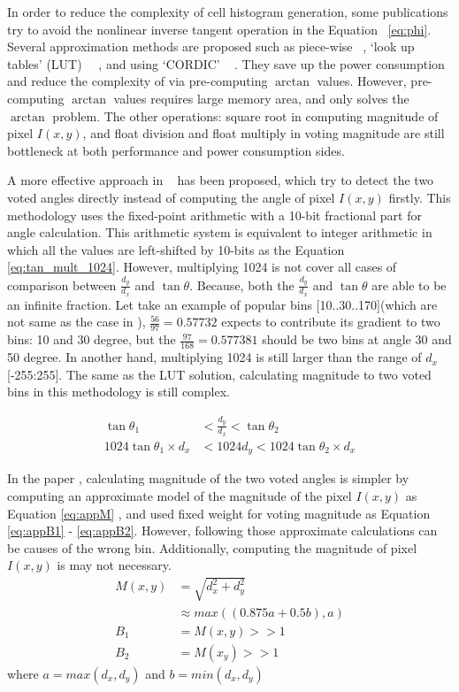 In order to reduce the complexity of cell histogram generation, some
publications try to avoid the nonlinear inverse tangent operation in the Equation ~\ref{eq:phi}.
Several approximation methods are proposed such as piece-wise
~\cite{karakaya2009iha}, ‘look up tables’ (LUT)
~\cite{gu2013ffm}~\cite{iandola2015leh}, and using ‘CORDIC’
~\cite{peker2012heh}\cite{takagi2013sdh}\cite{mizuno2012ash} .
They save up the power consumption and reduce the complexity of via
pre-computing $\arctan$ values.
However, pre-computing $\arctan$ values requires large memory area, and only
solves the $\arctan$ problem.
The other operations: square root
in computing magnitude of pixel $I(x,y)$, and float division and float
multiply in voting magnitude are still bottleneck at both performance and power consumption sides.


A more effective approach in  ~\cite{negi2011dpo} \cite{suleiman2014eho}  has
been proposed, which try to detect the two voted
angles directly instead of computing the angle of pixel $I(x,y)$ firstly.
This methodology uses the  fixed-point arithmetic with a 10-bit fractional part
for angle calculation.
This arithmetic system is equivalent to integer arithmetic in which all the
values are left-shifted by 10-bits as  the  Equation~ \ref{eq:tan_mult_1024}.
However, multiplying 1024 is not cover all cases of comparison between
$\frac{d_y}{d_x}$ and $\tan\theta$.
Because, both the $\frac{d_y}{d_x}$ and $\tan\theta$ are able to be an infinite
fraction.
Let take an example of popular bins [10..30..170](which are not same as the
case in \cite{negi2011dpo} \cite{suleiman2014eho}), $\frac{56}{97} = 0.57732$
expects to contribute its gradient to two bins: 10 and 30 degree, but the
$\frac{97}{168} = 0.577381$ should be two bins at angle 30 and 50 degree.
In another hand, multiplying 1024 is still larger than the range of $d_x$
[-255:255].
The same as the LUT solution, calculating magnitude to two voted bins in this
methodology is still complex.

\begin{align}
	\tan\theta_1 & < \frac{d_y}{d_x} < \tan\theta_2 \\
	1024\tan\theta_1\times d_x & < 1024d_y < 1024\tan\theta_2\times d_x \label{eq:tan_mult_1024}
\end{align}

In the paper \cite{pei-yinchen2014ehia} \cite{hsiao2016hdh}   ,  calculating magnitude of the two voted
angles is simpler by computing an approximate model of the magnitude of the pixel
$I(x,y)$ as Equation \ref{eq:appM} , and used fixed weight for voting  magnitude
as Equation \ref{eq:appB1} - \ref{eq:appB2}.
However, following those approximate calculations can be causes of the wrong bin.
Additionally, computing the magnitude of pixel $I(x,y)$ is may not necessary.
\begin{align}
	M(x,y) &= \sqrt{d^2_x + d^2_y} \nonumber \\
				 &\approx max((0.875a + 0.5b), a) \label{eq:appM} \\
	B_1 &= M(x,y) >> 1 \label{eq:appB1}\\
	B_2 &= M(x_y) >> 1 \label{eq:appB2}
\end{align}
where $a = max(d_x, d_y)$ and $b = min(d_x, d_y)$

